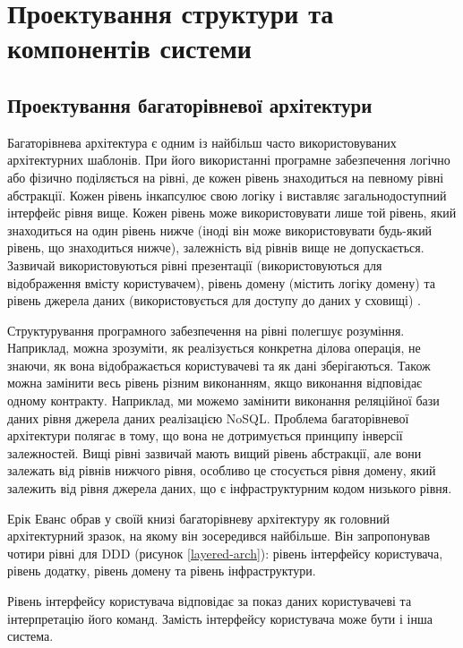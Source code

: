 \section[ПРОЕКТУВАННЯ СТРУКТУРИ ТА КОМПОНЕНТІВ СИСТЕМИ]{Проектування структури та компонентів системи}

\subsection{Проектування багаторівневої архітектури}

Багаторівнева архітектура є одним із найбільш часто використовуваних
архітектурних шаблонів. При його використанні програмне забезпечення
логічно або фізично поділяється на рівні, де кожен рівень знаходиться на
певному рівні абстракції. Кожен рівень інкапсулює свою логіку і
виставляє загальнодоступний інтерфейс рівня вище. Кожен рівень
може використовувати лише той рівень, який знаходиться на один
рівень нижче (іноді він може використовувати будь-який рівень,
що знаходиться нижче), залежність від рівнів вище не допускається.
Зазвичай використовуються рівні презентації (використовуються
для відображення вмісту користувачем), рівень домену
(містить логіку домену) та рівень джерела даних 
(використовується для доступу до даних у сховищі) \cite{multitier-thesis}.

Структурування програмного забезпечення на рівні полегшує розуміння.
Наприклад, можна зрозуміти, як реалізується конкретна ділова операція,
не знаючи, як вона відображається користувачеві та як дані зберігаються.
Також можна замінити весь рівень різним виконанням,
якщо виконання відповідає одному контракту. Наприклад, ми можемо замінити
виконання реляційної бази даних рівня джерела даних реалізацією NoSQL.
Проблема багаторівневої архітектури полягає в тому,
що вона не дотримується принципу інверсії залежностей. Вищі рівні
зазвичай мають вищий рівень абстракції, але вони залежать від рівнів
нижчого рівня, особливо це стосується рівня домену,
який залежить від рівня джерела даних, що є інфраструктурним кодом низького рівня.

Ерік Еванс обрав у своїй книзі багаторівневу архітектуру як головний
архітектурний зразок, на якому він зосередився найбільше.
Він запропонував чотири рівні для DDD (рисунок \ref{layered-arch}):
рівень інтерфейсу користувача, рівень додатку, рівень
домену та рівень інфраструктури.

Рівень інтерфейсу користувача відповідає за показ даних користувачеві
та інтерпретацію його команд. Замість інтерфейсу користувача може бути 
і інша система.

